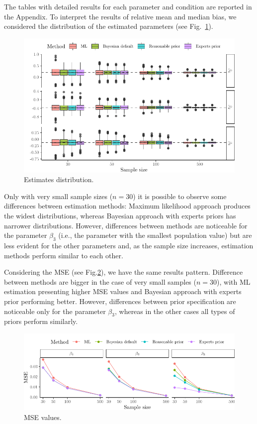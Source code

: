 \documentclass[graybox]{svmult}
\begin{document}
The tables with detailed results for each parameter and condition are reported in the Appendix. To interpret the results of relative mean and median bias, we considered the distribution of the estimated parameters (see Fig.~\ref{fig:boxplots}). 
\begin{figure}[b]
	\sidecaption
	\includegraphics[width = .9\textwidth]{figure/Plot_boxplots}
	\caption{Estimates distribution.}
	\label{fig:boxplots}
\end{figure}
Only with very small sample sizes ($n=30$) it is possible to observe some differences between estimation methods: Maximum likelihood approach produces the widest distributions, whereas Bayesian approach with experts priors has narrower distributions. However, differences between methods are noticeable for the parameter $\beta_3$ (i.e., the parameter with the smallest population value) but are less evident for the other parameters and, as the sample size increases, estimation methods perform similar to each other.

Considering the MSE (see Fig.\ref{fig:mse}), we have the same results pattern. Difference between methods are bigger in the case of very small samples ($n=30$), with ML estimation presenting higher MSE values and Bayesian approach with experts prior performing better. However, differences between prior specification are noticeable only for the parameter $\beta_3$, whereas in the other cases all types of priors perform similarly.
\begin{figure}[t]
	\sidecaption
	\includegraphics[width = .9\textwidth]{figure/Plot_MSE}
	\caption{MSE values.}
	\label{fig:mse}
\end{figure}
\end{document}
